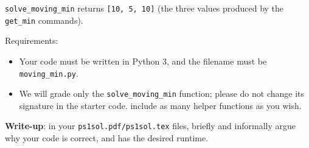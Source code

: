 \documentclass{assignment-263}
\begin{document}
\begin{enumerate}
\verb|solve_moving_min| returns \verb|[10, 5, 10]| (the three values produced by the \verb|get_min| commands).
   
Requirements:
\begin{itemize}
\item Your code must be written in Python 3, and the filename must be \verb|moving_min.py|.
\item We will grade only the \verb|solve_moving_min| function; please do not change its signature in the starter code. include as many helper functions as you wish.
   \end{itemize}
   
\textbf{Write-up}: in your \verb|ps1sol.pdf/ps1sol.tex| files, briefly and informally argue why your code is correct, and has the desired runtime.



\end{enumerate}
\end{document}
